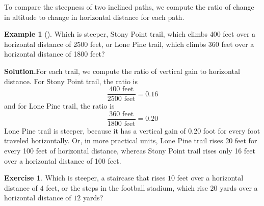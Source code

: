 \documentclass[10pt,]{book}
\theoremstyle{plain}
\theoremstyle{definition}
\theoremstyle{definition}
\newtheorem{example}[theorem]{Example}
\theoremstyle{definition}
\theoremstyle{definition}
\newtheorem{exercise}[theorem]{Exercise}
\numberwithin{equation}{part}
\begin{document}
To compare the steepness of two inclined paths, we compute the ratio of change in altitude to change in horizontal distance for each path.%
\begin{example}[]\label{example-steep-trail}
Which is steeper, Stony Point trail, which climbs 400 feet over a horizontal distance of 2500 feet, or Lone Pine trail, which climbs 360 feet over a horizontal distance of 1800 feet?%
\par\medskip\noindent%
\textbf{Solution.}\quad For each trail, we compute the ratio of vertical gain to horizontal distance. For Stony Point trail, the ratio is%
\begin{equation*}
\frac{400 \text{ feet}}{2500 \text{ feet}}= 0.16 
\end{equation*}
and for Lone Pine trail, the ratio is%
\begin{equation*}
\frac{360 \text{ feet}}{1800 \text{ feet}}= 0.20 
\end{equation*}
Lone Pine trail is steeper, because it has a vertical gain of 0.20 foot for every foot traveled horizontally. Or, in more practical units, Lone Pine trail rises 20 feet for every 100 feet of horizontal distance, whereas Stony Point trail rises only 16 feet over a horizontal distance of 100 feet.%
\end{example}
\begin{exercise}\label{exercise-steep-steps}
Which is steeper, a staircase that rises \(10\) feet over a horizontal distance of \(4\) feet, or the steps in the football stadium, which rise \(20\) yards over a horizontal distance of \(12\) yards?%
\end{exercise}
\typeout{************************************************}
\typeout{************************************************}
\end{document}
